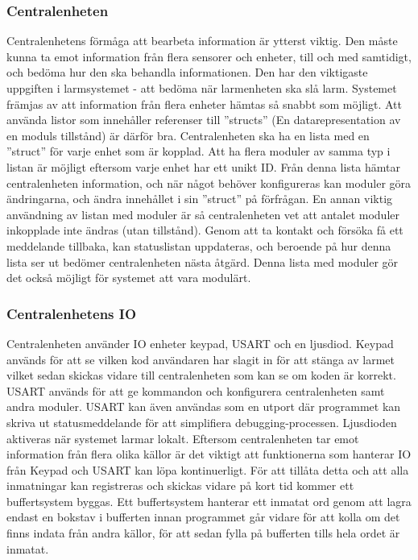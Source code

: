 \documentclass[a4paper]{article}
\begin{document}
\subsubsection{Centralenheten}
\label{sec:centralenhetLD}
Centralenhetens förmåga att bearbeta information är ytterst viktig. Den måste kunna ta emot information från flera sensorer och enheter, till och med samtidigt, och bedöma hur den ska behandla informationen. Den har den viktigaste uppgiften i larmsystemet - att bedöma när larmenheten ska slå larm. 
\newline \newline
Systemet främjas av att information från flera enheter hämtas så snabbt som möjligt. Att använda listor som innehåller referenser till ''structs'' (En datarepresentation av en moduls tillstånd) är därför bra. Centralenheten ska ha en lista med en ''struct'' för varje enhet som är kopplad. Att ha flera moduler av samma typ i listan är möjligt eftersom varje enhet har ett unikt ID. Från denna lista hämtar centralenheten information, och när något behöver konfigureras kan moduler göra ändringarna, och ändra innehållet i sin ''struct'' på förfrågan. 
\newline \newline
En annan viktig användning av listan med moduler är så centralenheten vet att antalet moduler inkopplade inte ändras (utan tillstånd). Genom att ta kontakt och försöka få ett meddelande tillbaka, kan  statuslistan uppdateras, och beroende på hur denna lista ser ut bedömer centralenheten nästa åtgärd. Denna lista med moduler gör det också möjligt för systemet att vara modulärt. 

\subsubsection{Centralenhetens IO}
\label{sec:centralenhetIO}

Centralenheten använder IO enheter keypad, USART och en ljusdiod. Keypad används för att se vilken kod användaren har slagit in för att stänga av larmet vilket sedan skickas vidare till centralenheten som kan se om koden är korrekt. USART används för att ge kommandon och konfigurera centralenheten samt andra moduler. USART kan även användas som en utport där programmet kan skriva ut statusmeddelande för att simplifiera debugging-processen. Ljusdioden aktiveras när systemet larmar lokalt. 
\newline\newline
Eftersom centralenheten tar emot information från flera olika källor är det viktigt att funktionerna som hanterar IO från Keypad och USART kan löpa kontinuerligt.  För att tillåta detta och att alla inmatningar kan registreras och skickas vidare på kort tid kommer ett buffertsystem byggas. Ett buffertsystem hanterar ett inmatat ord genom att lagra endast en bokstav i bufferten innan programmet går vidare för att kolla om det finns indata från andra källor, för att sedan fylla på bufferten tills hela ordet är inmatat. 
\end{document}

